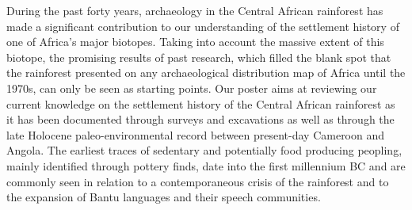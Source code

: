 \documentclass[a0]{sciposter}
\begin{document}
{\begin{minipage}[t][102cm][t]{82cm}
\vspace{2cm}\hspace{2cm}\begin{minipage}[t]{77cm} %
{\fontsize{28}{36} \selectfont During the past forty years, archaeology in the Central African rainforest has made a significant contribution to our understanding of the settlement history of one of Africa's major biotopes. Taking into account the massive extent of this biotope, the promising results of past research, which filled the blank spot that the rainforest presented on any archaeological distribution map of Africa until the 1970s, can only be seen as starting points. Our poster aims at reviewing our current knowledge on the settlement history of the Central African rainforest as it has been documented through surveys and excavations as well as through the late Holocene paleo-environmental record between present-day Cameroon and Angola.}
\bigbreak
{\fontsize{28}{36} \selectfont The earliest traces of sedentary and potentially food producing peopling, mainly identified through pottery finds, date into the first millennium BC and are commonly seen in relation to a contemporaneous crisis of the rainforest and to the expansion of Bantu languages and their speech communities.}
\end{minipage}

\vspace{2cm}
\hspace{2cm}\begin{minipage}[t]{77cm}
\begin{multicols}{3}


\end{multicols}
\end{minipage}
\end{minipage}}
\end{document}
